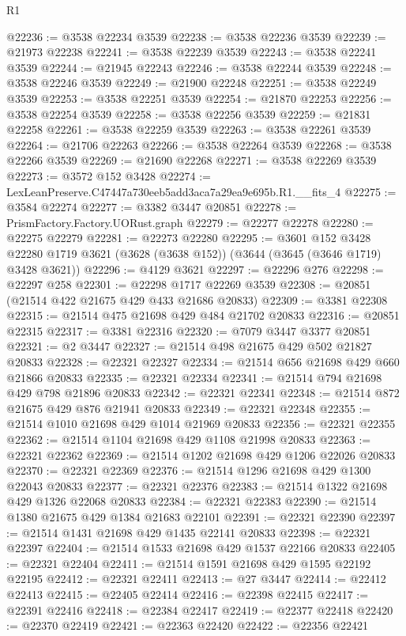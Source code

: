 \begin{lexlean}{R1}
\begin{coremodule}
@22236 := @3538 @22234 @3539
@22238 := @3538 @22236 @3539
@22239 := @21973 @22238
@22241 := @3538 @22239 @3539
@22243 := @3538 @22241 @3539
@22244 := @21945 @22243
@22246 := @3538 @22244 @3539
@22248 := @3538 @22246 @3539
@22249 := @21900 @22248
@22251 := @3538 @22249 @3539
@22253 := @3538 @22251 @3539
@22254 := @21870 @22253
@22256 := @3538 @22254 @3539
@22258 := @3538 @22256 @3539
@22259 := @21831 @22258
@22261 := @3538 @22259 @3539
@22263 := @3538 @22261 @3539
@22264 := @21706 @22263
@22266 := @3538 @22264 @3539
@22268 := @3538 @22266 @3539
@22269 := @21690 @22268
@22271 := @3538 @22269 @3539
@22273 := @3572 @152 @3428
@22274 := LexLeanPreserve.C47447a730eeb5add3aca7a29ea9e695b.R1.__fits_4
@22275 := @3584 @22274
@22277 := @3382 @3447 @20851
@22278 := PrismFactory.Factory.UORust.graph
@22279 := @22277 @22278
@22280 := @22275 @22279
@22281 := @22273 @22280
@22295 := @3601
    @152
    @3428
    @22280
    @1719
    @3621
    (@3628 (@3638 @152))
    (@3644 (@3645 (@3646 @1719) @3428 @3621))
@22296 := @4129 @3621
@22297 := @22296 @276
@22298 := @22297 @258
@22301 := @22298 @1717 @22269 @3539
@22308 := @20851 (@21514 @422 @21675 @429 @433 @21686 @20833)
@22309 := @3381 @22308
@22315 := @21514 @475 @21698 @429 @484 @21702 @20833
@22316 := @20851 @22315
@22317 := @3381 @22316
@22320 := @7079 @3447 @3377 @20851
@22321 := @2 @3447
@22327 := @21514 @498 @21675 @429 @502 @21827 @20833
@22328 := @22321 @22327
@22334 := @21514 @656 @21698 @429 @660 @21866 @20833
@22335 := @22321 @22334
@22341 := @21514 @794 @21698 @429 @798 @21896 @20833
@22342 := @22321 @22341
@22348 := @21514 @872 @21675 @429 @876 @21941 @20833
@22349 := @22321 @22348
@22355 := @21514 @1010 @21698 @429 @1014 @21969 @20833
@22356 := @22321 @22355
@22362 := @21514 @1104 @21698 @429 @1108 @21998 @20833
@22363 := @22321 @22362
@22369 := @21514 @1202 @21698 @429 @1206 @22026 @20833
@22370 := @22321 @22369
@22376 := @21514 @1296 @21698 @429 @1300 @22043 @20833
@22377 := @22321 @22376
@22383 := @21514 @1322 @21698 @429 @1326 @22068 @20833
@22384 := @22321 @22383
@22390 := @21514 @1380 @21675 @429 @1384 @21683 @22101
@22391 := @22321 @22390
@22397 := @21514 @1431 @21698 @429 @1435 @22141 @20833
@22398 := @22321 @22397
@22404 := @21514 @1533 @21698 @429 @1537 @22166 @20833
@22405 := @22321 @22404
@22411 := @21514 @1591 @21698 @429 @1595 @22192 @22195
@22412 := @22321 @22411
@22413 := @27 @3447
@22414 := @22412 @22413
@22415 := @22405 @22414
@22416 := @22398 @22415
@22417 := @22391 @22416
@22418 := @22384 @22417
@22419 := @22377 @22418
@22420 := @22370 @22419
@22421 := @22363 @22420
@22422 := @22356 @22421

\end{coremodule}
\end{lexlean}
